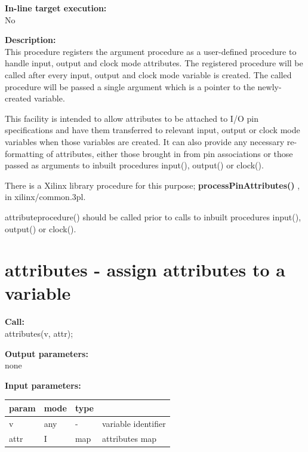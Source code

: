         {\bf In-line target execution:} \\
        No
        
        {\bf Description:} \\
        This procedure registers the argument procedure as a user-defined procedure
        to handle input, output and clock mode attributes. The registered procedure
        will be called after every input, output and clock mode variable is
        created. The called procedure will be passed a single argument which is a
        pointer to the newly-created variable.

        This facility is intended to allow attributes to be attached to I/O pin
        specifications and have them transferred to relevant input, output or
        clock mode variables when those variables are created. It can also provide
        any necessary re-formatting of attributes, either those brought in from pin
        associations or those passed as arguments to inbuilt procedures input(),
        output() or clock().
        
        There is a Xilinx library procedure for this purpose;
        {\bf processPinAttributes()} ,
        in xilinx/common.3pl.
        
        attributeprocedure() should be called prior to calls to inbuilt procedures
        input(), output() or clock().
        



    \section{attributes - assign attributes to a variable}\label{sec:ipattributes}
        
        {\bf Call:} \\
        attributes(v, attr);
        
        {\bf Output parameters:} \\
        none
        
        {\bf Input parameters:} \\
        \begin{tabular}{| l | l | l | l |}
        \hline
        param & mode & type  & \\
        \hline \hline
        v     & any &  -  & variable identifier \\ \hline
        attr  & I   & map & attributes map      \\ \hline
        \end{tabular}
        

